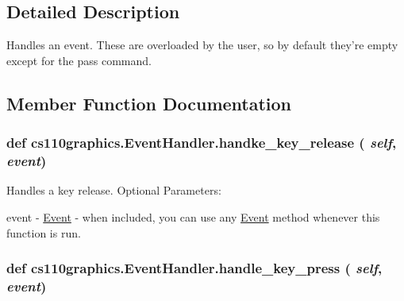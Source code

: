 \subsection{Detailed Description}
Handles an event. These are overloaded by the user, so by default they're empty except for the pass command. 

\subsection{Member Function Documentation}
\hypertarget{classcs110graphics_1_1EventHandler_a6f5269e8062aaee8918560c637383c6e}{
\subsubsection[{handke\_\-key\_\-release}]{\setlength{\rightskip}{0pt plus 5cm}def cs110graphics.EventHandler.handke\_\-key\_\-release ( {\em self}, \/   {\em event})}}
\label{classcs110graphics_1_1EventHandler_a6f5269e8062aaee8918560c637383c6e}


Handles a key release. Optional Parameters:
\begin{DoxyItemize}
\item event -\/ \hyperlink{classcs110graphics_1_1Event}{Event} -\/ when included, you can use any \hyperlink{classcs110graphics_1_1Event}{Event} method whenever this function is run. 
\end{DoxyItemize}\hypertarget{classcs110graphics_1_1EventHandler_af3fb3531d0b23f1430a830586cd07906}{
\subsubsection[{handle\_\-key\_\-press}]{\setlength{\rightskip}{0pt plus 5cm}def cs110graphics.EventHandler.handle\_\-key\_\-press ( {\em self}, \/   {\em event})}}
\label{classcs110graphics_1_1EventHandler_af3fb3531d0b23f1430a830586cd07906}


